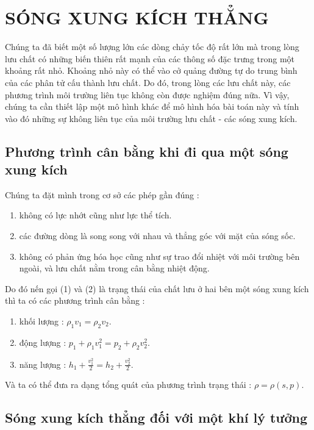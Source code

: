 \documentclass[DONG_CHAY_NEN_DUOC.tex]{subfiles}
\begin{document}
\chapter{SÓNG XUNG KÍCH THẲNG}

Chúng ta đã biết một số lượng lớn các dòng chảy tốc độ rất lớn mà trong lòng lưu chất có những biến thiên rất mạnh của các thông số đặc trưng trong một khoảng rất nhỏ. Khoảng nhỏ này có thể vào cở quảng đường tự do trung bình của các phân tử cấu thành lưu chất. Do đó, trong lòng các lưu chất này, các phương trình môi trường liên tục không còn được nghiệm đúng nữa. Vì vậy, chúng ta cần thiết lập một mô hình khác để mô hình hóa bài toán này và tính vào đó những sự không liên tục của môi trường lưu chất - các sóng xung kích.



\section{Phương trình cân bằng khi đi qua một sóng xung kích}

Chúng ta đặt mình trong cơ sở các phép gần đúng :
\begin{enumerate}
	\item không có lực nhớt cũng như lực thể tích.
	\item các đường dòng là song song với nhau và thẳng góc với mặt của sóng sốc.
	\item không có phản ứng hóa học cũng như sự trao đổi nhiệt với môi trường bên ngoài, và lưu chất nằm trong cân bằng nhiệt động.
\end{enumerate}

Do đó nến gọi (1) và (2) là trạng thái của chất lưu ở hai bên một sóng xung kích thì ta có các phương trình cân bằng :
\begin{enumerate}
	\item khối lượng : $\rho_1 v_1 = \rho_2 v_2$.
	\item động lượng : $p_1 + \rho_1 v_1^2 = p_2 + \rho_2 v_2^2$.
	\item năng lượng : $h_1 + \frac{v_1^2}{2} = h_2 + \frac{v_2^2}{2}$.
\end{enumerate}

Và ta có thể đưa ra dạng tổng quát của phương trình trạng thái : $\rho = \rho(s,p)$.

\section{Sóng xung kích thẳng đối với một khí lý tưởng}
\end{document}
